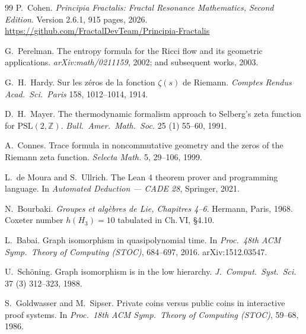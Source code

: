 \documentclass[11pt,a4paper]{amsart}
\theoremstyle{plain}
\theoremstyle{definition}
\begin{document}
\begin{thebibliography}{99}
P.~Cohen.
\newblock \emph{Principia Fractalis: Fractal Resonance Mathematics, Second Edition}.
\newblock Version 2.6.1, 915 pages, 2026.
\newblock \url{https://github.com/FractalDevTeam/Principia-Fractalis}

G.~Perelman.
\newblock The entropy formula for the Ricci flow and its geometric applications.
\newblock \emph{arXiv:math/0211159}, 2002; and subsequent works, 2003.

G.~H.~Hardy.
\newblock Sur les z\'eros de la fonction $\zeta(s)$ de Riemann.
\newblock \emph{Comptes Rendus Acad.\ Sci.\ Paris} 158, 1012--1014, 1914.

D.~H.~Mayer.
\newblock The thermodynamic formalism approach to Selberg's zeta function for $\mathrm{PSL}(2,\mathbb{Z})$.
\newblock \emph{Bull.\ Amer.\ Math.\ Soc.} 25 (1) 55--60, 1991.

A.~Connes.
\newblock Trace formula in noncommutative geometry and the zeros of the Riemann zeta function.
\newblock \emph{Selecta Math.} 5, 29--106, 1999.

L.~de Moura and S.~Ullrich.
\newblock The Lean 4 theorem prover and programming language.
\newblock In \emph{Automated Deduction --- CADE 28}, Springer, 2021.

N.~Bourbaki.
\newblock \emph{Groupes et alg\`ebres de Lie, Chapitres 4--6}.
\newblock Hermann, Paris, 1968.
\newblock Coxeter number $h(H_3) = 10$ tabulated in Ch.\,VI, \S 4.10.

L.~Babai.
\newblock Graph isomorphism in quasipolynomial time.
\newblock In \emph{Proc.\ 48th ACM Symp.\ Theory of Computing (STOC)}, 684--697, 2016.
\newblock arXiv:1512.03547.

U.~Sch\"oning.
\newblock Graph isomorphism is in the low hierarchy.
\newblock \emph{J.\ Comput.\ Syst.\ Sci.} 37 (3) 312--323, 1988.

S.~Goldwasser and M.~Sipser.
\newblock Private coins versus public coins in interactive proof systems.
\newblock In \emph{Proc.\ 18th ACM Symp.\ Theory of Computing (STOC)}, 59--68, 1986.

\end{thebibliography}
\end{document}
